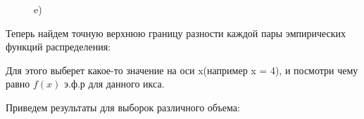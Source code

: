 \documentclass[a4paper,12pt, oneside]{book}
\begin{document}
\begin{figure}[h!]
\begin{center}
\begin{minipage}[h]{0.47\linewidth}
		 e) \\
	\end{minipage}
	\end{center}
\end{figure}

\newpage
Теперь найдем точную верхнюю границу разности каждой пары эмпирических функций распределения:

Для этого выберет какое-то значение на оси x(например x = 4), и посмотри чему равно $f(x)$ э.ф.р для данного икса.

Приведем результаты для выборок различного объема:
\vspace{5mm}
\end{document}
